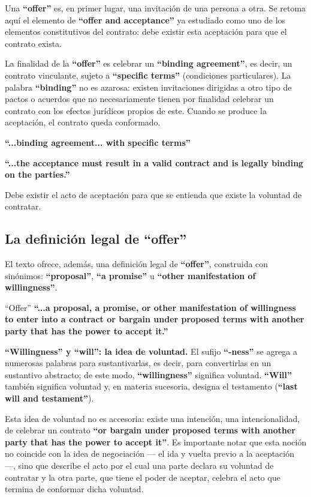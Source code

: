 \documentclass[12pt,oneside]{book}
\begin{document}
Una \textbf{``offer''} es, en primer lugar, una invitación de una persona a otra. Se retoma aquí el elemento de \textbf{``offer and acceptance''} ya estudiado como uno de los elementos constitutivos del contrato: debe existir esta aceptación para que el contrato exista.

La finalidad de la \textbf{``offer''} es celebrar un \textbf{``binding agreement''}, es decir, un contrato vinculante, sujeto a \textbf{``specific terms''} (condiciones particulares). La palabra \textbf{``binding''} no es azarosa: existen invitaciones dirigidas a otro tipo de pactos o acuerdos que no necesariamente tienen por finalidad celebrar un contrato con los efectos jurídicos propios de este. Cuando se produce la aceptación, el contrato queda conformado.

\begin{note}
\textbf{``...binding agreement... with specific terms''}

\textbf{``...the acceptance must result in a valid contract and is legally binding on the parties.''}
\end{note}

Debe existir el acto de aceptación para que se entienda que existe la voluntad de contratar.

\subsection{La definición legal de ``offer''}

El texto ofrece, además, una definición legal de \textbf{``offer''}, construida con sinónimos: \textbf{``proposal''}, \textbf{``a promise''} u \textbf{``other manifestation of willingness''}.

\begin{definition}{``Offer''}
\textbf{``...a proposal, a promise, or other manifestation of willingness to enter into a contract or bargain under proposed terms with another party that has the power to accept it.''}
\end{definition}

\textbf{``Willingness'' y ``will'': la idea de voluntad.} El sufijo \textbf{``-ness''} se agrega a numerosas palabras para sustantivarlas, es decir, para convertirlas en un sustantivo abstracto; de este modo, \textbf{``willingness''} significa voluntad. \textbf{``Will''} también significa voluntad y, en materia sucesoria, designa el testamento (\textbf{``last will and testament''}).

Esta idea de voluntad no es accesoria: existe una intención, una intencionalidad, de celebrar un contrato \textbf{``or bargain under proposed terms with another party that has the power to accept it''}. Es importante notar que esta noción no coincide con la idea de negociación --- el ida y vuelta previo a la aceptación ---, sino que describe el acto por el cual una parte declara su voluntad de contratar y la otra parte, que tiene el poder de aceptar, celebra el acto que termina de conformar dicha voluntad.
\end{document}

